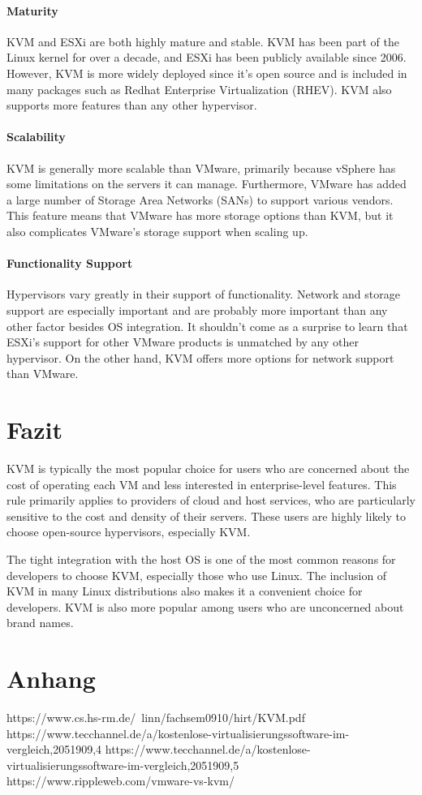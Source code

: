 \documentclass[14pt]{extreport}
\begin{document}
\subsubsection{Maturity}

KVM and ESXi are both highly mature and stable. KVM has been part of the Linux kernel for over a decade, and ESXi has been publicly available since 2006. However, KVM is more widely deployed since it’s open source and is included in many packages such as Redhat Enterprise Virtualization (RHEV). KVM also supports more features than any other hypervisor.
\subsubsection{Scalability}

KVM is generally more scalable than VMware, primarily because vSphere has some limitations on the servers it can manage. Furthermore, VMware has added a large number of Storage Area Networks (SANs) to support various vendors. This feature means that VMware has more storage options than KVM, but it also complicates VMware’s storage support when scaling up.
\subsubsection{Functionality Support}

Hypervisors vary greatly in their support of functionality. Network and storage support are especially important and are probably more important than any other factor besides OS integration. It shouldn’t come as a surprise to learn that ESXi’s support for other VMware products is unmatched by any other hypervisor. On the other hand, KVM offers more options for network support than VMware.

\chapter{Fazit}
KVM is typically the most popular choice for users who are concerned about the cost of operating each VM and less interested in enterprise-level features. This rule primarily applies to providers of cloud and host services, who are particularly sensitive to the cost and density of their servers. These users are highly likely to choose open-source hypervisors, especially KVM.

The tight integration with the host OS is one of the most common reasons for developers to choose KVM, especially those who use Linux. The inclusion of KVM in many Linux distributions also makes it a convenient choice for developers. KVM is also more popular among users who are unconcerned about brand names.
\chapter{Anhang}
\printbibliography

https://www.cs.hs-rm.de/~linn/fachsem0910/hirt/KVM.pdf
https://www.tecchannel.de/a/kostenlose-virtualisierungssoftware-im-vergleich,2051909,4
https://www.tecchannel.de/a/kostenlose-virtualisierungssoftware-im-vergleich,2051909,5
https://www.rippleweb.com/vmware-vs-kvm/
\end{document}
